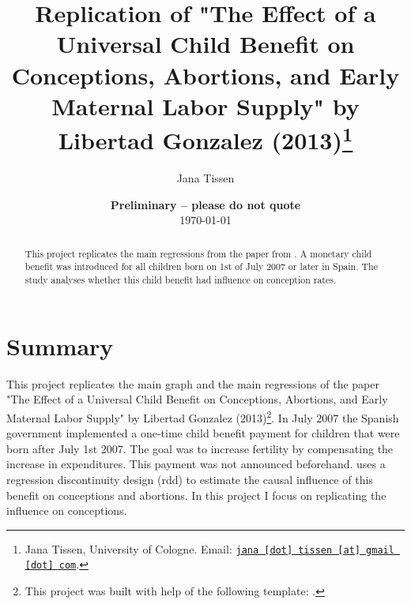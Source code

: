 \documentclass[11pt, a4paper, leqno]{article}
\begin{document}
\title{Replication of "The Effect of a Universal Child Benefit on Conceptions, Abortions, and Early Maternal Labor Supply"
by Libertad Gonzalez (2013)\thanks{Jana Tissen, University of Cologne. Email: \href{mailto:jana.tissen@gmail.com}{\nolinkurl{jana [dot] tissen [at] gmail [dot] com}}.}}

\author{Jana Tissen}

\date{
    {\bf Preliminary -- please do not quote}
    \\[1ex]
    \today
}

\maketitle


\begin{abstract}
This project replicates the main regressions from the paper from \citet{gonzalez2013effect}. A monetary child benefit was introduced
for all children born on 1st of July 2007 or later in Spain. The study analyses whether this child benefit had influence on 
conception rates.
\end{abstract}

\clearpage


\section{Summary}
\label{sec:summary}

This project replicates the main graph and the main regressions of the paper "The Effect of a Universal Child Benefit on Conceptions, Abortions, and Early Maternal Labor Supply"
by Libertad Gonzalez (2013)\footnote{This project was built with help of the following template: \citet{GaudeckerEconProjectTemplates}.}.
In July 2007 the Spanish government implemented a one-time child benefit payment for children that
were born after July 1st 2007. The goal was to increase fertility by compensating the increase in expenditures.
This payment was not announced beforehand. \citet{gonzalez2013effect} uses a regression discontinuity design (rdd) to estimate the causal influence
of this benefit on conceptions and abortions.
In this project I focus on replicating the influence on conceptions.
\end{document}
